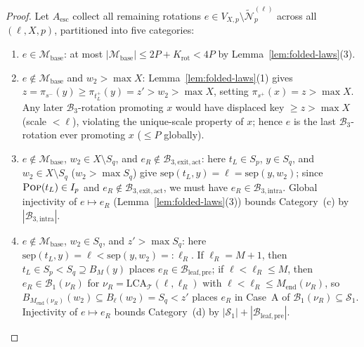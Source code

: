\documentclass[11pt]{article}
\theoremstyle{definition}
\theoremstyle{remark}
\newcommand{\LCA}{\mathrm{LCA}}
\newcommand{\sep}{\mathrm{sep}}
\newcommand{\POP}{\textnormal{\scshape Pop}}
\begin{document}
\begin{proof}
Let $A_{\mathrm{esc}}$ collect all remaining rotations $e \in V_{X, p} \setminus \widetilde{\mathcal{N}}_p^{(\ell)}$ across all $(\ell, X, p)$, partitioned into five categories:
\begin{enumerate}[label=(\alph*)]
  \item $e \in \mathcal{M}_{\mathrm{base}}$: at most $|\mathcal{M}_{\mathrm{base}}| \le 2P + K_{\mathrm{rot}} < 4P$ by Lemma~\ref{lem:folded-laws}(3).
  \item $e \notin \mathcal{M}_{\mathrm{base}}$ and $w_2 > \max X$: Lemma~\ref{lem:folded-laws}(1) gives $z = \pi_{s^-}(y) \ge \pi_{t_L^+}(y) = z' > w_2 > \max X$, setting $\pi_{s^+}(x) = z > \max X$. Any later $\mathcal{B}_3$-rotation promoting $x$ would have displaced key $\ge z > \max X$ (scale $< \ell$), violating the unique-scale property of $x$; hence $e$ is the last $\mathcal{B}_3$-rotation ever promoting $x$ ($\le P$ globally).
  \item $e \notin \mathcal{M}_{\mathrm{base}}$, $w_2 \in X \setminus S_q$, and $e_R \notin \mathcal{B}_{3,\mathrm{exit,act}}$: here $t_L \in S_p$, $y \in S_q$, and $w_2 \in X \setminus S_q$ ($w_2 > \max S_q$) give $\sep(t_L, y) = \ell = \sep(y, w_2)$; since $\POP(t_L) \in I_p$ and $e_R \notin \mathcal{B}_{3,\mathrm{exit,act}}$, we must have $e_R \in \mathcal{B}_{3,\mathrm{intra}}$. Global injectivity of $e \mapsto e_R$ (Lemma~\ref{lem:folded-laws}(3)) bounds Category~(c) by $|\mathcal{B}_{3,\mathrm{intra}}|$.
  \item $e \notin \mathcal{M}_{\mathrm{base}}$, $w_2 \in S_q$, and $z' > \max S_q$: here $\sep(t_L, y) = \ell < \sep(y, w_2) =: \ell_R$. If $\ell_R = M + 1$, then $t_L \in S_p < S_q \supseteq B_M(y)$ places $e_R \in \mathcal{B}_{\mathrm{leaf,pre}}$; if $\ell < \ell_R \le M$, then $e_R \in \mathcal{B}_1(\nu_R)$ for $\nu_R = \LCA_{\mathcal{T}}(\ell, \ell_R)$ with $\ell < \ell_R \le M_{\mathrm{end}}(\nu_R)$, so $B_{M_{\mathrm{end}}(\nu_R)}(w_2) \subseteq B_\ell(w_2) = S_q < z'$ places $e_R$ in Case~A of $\mathcal{B}_1(\nu_R) \subseteq \mathcal{S}_1$. Injectivity of $e \mapsto e_R$ bounds Category~(d) by $|\mathcal{S}_1| + |\mathcal{B}_{\mathrm{leaf,pre}}|$.

\end{enumerate}
\end{proof}
\end{document}
